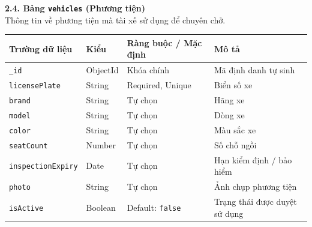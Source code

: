\documentclass[../DoAn.tex]{subfiles}
\begin{document}
\textbf{2.4. Bảng \texttt{vehicles} (Phương tiện)} \\
Thông tin về phương tiện mà tài xế sử dụng để chuyên chở.
\begin{table}[H]
    \centering
    \begin{tabular}{|l|l|p{4cm}|p{5cm}|}
        \hline
        \textbf{Trường dữ liệu}   & \textbf{Kiểu} & \textbf{Ràng buộc / Mặc định} & \textbf{Mô tả}                \\ \hline
        \texttt{\_id}             & ObjectId      & Khóa chính                    & Mã định danh tự sinh          \\ \hline
        \texttt{licensePlate}     & String        & Required, Unique              & Biển số xe                    \\ \hline
        \texttt{brand}            & String        & Tự chọn                       & Hãng xe                       \\ \hline
        \texttt{model}            & String        & Tự chọn                       & Dòng xe                       \\ \hline
        \texttt{color}            & String        & Tự chọn                       & Màu sắc xe                    \\ \hline
        \texttt{seatCount}        & Number        & Tự chọn                       & Số chỗ ngồi                   \\ \hline
        \texttt{inspectionExpiry} & Date          & Tự chọn                       & Hạn kiểm định / bảo hiểm      \\ \hline
        \texttt{photo}            & String        & Tự chọn                       & Ảnh chụp phương tiện          \\ \hline
        \texttt{isActive}         & Boolean       & Default: \texttt{false}       & Trạng thái được duyệt sử dụng \\ \hline
    \end{tabular}
\end{table}
\end{document}
